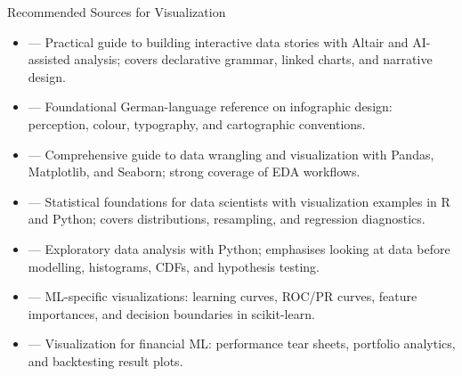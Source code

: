 \begin{v3topic}{Recommended Sources for Visualization}
    \begin{itemize}
        \item {} --- Practical guide to building
              interactive data stories with Altair and AI-assisted analysis; covers
              declarative grammar, linked charts, and narrative design.
        \item {} --- Foundational German-language
              reference on infographic design: perception, colour, typography, and
              cartographic conventions.
        \item {} --- Comprehensive guide to data
              wrangling and visualization with Pandas, Matplotlib, and Seaborn;
              strong coverage of EDA workflows.
        \item {} --- Statistical foundations
              for data scientists with visualization examples in R and Python; covers
              distributions, resampling, and regression diagnostics.
        \item {} --- Exploratory data analysis
              with Python; emphasises looking at data before modelling, histograms,
              CDFs, and hypothesis testing.
        \item {} --- ML-specific visualizations:
              learning curves, ROC/PR curves, feature importances, and decision
              boundaries in scikit-learn.
        \item {} --- Visualization for
              financial ML: performance tear sheets, portfolio analytics, and
              backtesting result plots.
    \end{itemize}
\end{v3topic}
